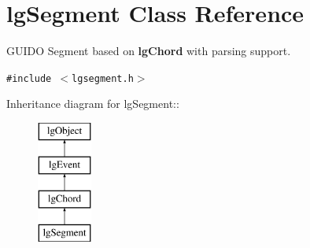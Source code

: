 \section{lg\-Segment Class Reference}
\label{classlgSegment}
GUIDO Segment based on {\bf lg\-Chord} with parsing support.  


{\tt \#include $<$lgsegment.h$>$}

Inheritance diagram for lg\-Segment::\begin{figure}[H]
\begin{center}
\leavevmode
\includegraphics[height=4cm]{classlgSegment}
\end{center}
\end{figure}
